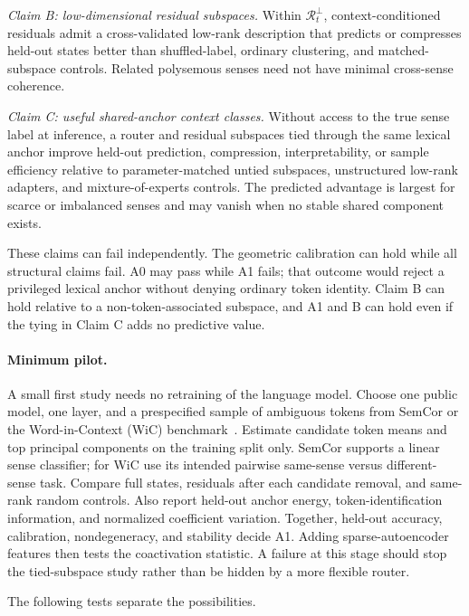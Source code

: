 \documentclass[
  aps,
  reprint,
  superscriptaddress,
  floatfix,
  nofootinbib,
  longbibliography
]{revtex4-2}
\begin{document}
\emph{Claim B: low-dimensional residual subspaces.}
Within $\mathcal R_t^\perp$, context-conditioned residuals admit a cross-validated
low-rank description that predicts or compresses held-out states better than
shuffled-label, ordinary clustering, and matched-subspace controls.  Related
polysemous senses need not have minimal cross-sense coherence.

\emph{Claim C: useful shared-anchor context classes.}
Without access to the true sense label at inference, a router and residual
subspaces tied through the same lexical anchor improve held-out prediction,
compression, interpretability, or sample efficiency relative to
parameter-matched untied subspaces, unstructured low-rank adapters, and
mixture-of-experts controls.  The predicted advantage is largest for scarce or
imbalanced senses and may vanish when no stable shared component exists.

These claims can fail independently.  The geometric calibration can hold while
all structural claims fail.  A0 may pass while A1 fails; that outcome
would reject a privileged lexical anchor without denying ordinary token
identity.  Claim B can hold relative to a non-token-associated subspace, and
A1 and B can hold even if the tying in Claim C adds no predictive value.

\paragraph{Minimum pilot.}
A small first study needs no retraining of the language model.  Choose one
public model, one
layer, and a prespecified sample of ambiguous tokens from SemCor or the
Word-in-Context (WiC) benchmark~\cite{pilehvar2019wic}.  Estimate candidate token
means and top principal components on the training split only.  SemCor supports
a linear sense classifier; for WiC use its intended pairwise same-sense versus
different-sense task.  Compare full states, residuals after each candidate
removal, and same-rank random controls.  Also report held-out anchor energy,
token-identification information, and normalized coefficient variation.
Together, held-out accuracy, calibration, nondegeneracy, and stability decide
A1.
Adding sparse-autoencoder features then tests the coactivation statistic.  A
failure at this stage should stop the tied-subspace study rather than be
hidden by a more flexible router.

The following tests separate the possibilities.
\end{document}
